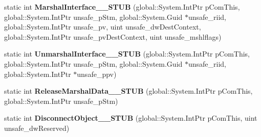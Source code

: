 \begin{DoxyCompactItemize}
\item 
\mbox{\label{struct_system_1_1_runtime_1_1_interop_services_1_1_i_marshal_____system___runtime___windows_runtime_____impl_1_1_vtbl_a8ca757bdde9525e1da4e2ba60a35ffd6}} 
static int {\bfseries Marshal\+Interface\+\_\+\+\_\+\+S\+T\+UB} (global\+::\+System.\+Int\+Ptr p\+Com\+This, global\+::\+System.\+Int\+Ptr unsafe\+\_\+p\+Stm, global\+::\+System.\+Guid $\ast$unsafe\+\_\+riid, global\+::\+System.\+Int\+Ptr unsafe\+\_\+pv, uint unsafe\+\_\+dw\+Dest\+Context, global\+::\+System.\+Int\+Ptr unsafe\+\_\+pv\+Dest\+Context, uint unsafe\+\_\+mshlflags)
\item 
\mbox{\label{struct_system_1_1_runtime_1_1_interop_services_1_1_i_marshal_____system___runtime___windows_runtime_____impl_1_1_vtbl_a6325016e621765b68878de65e7fe333e}} 
static int {\bfseries Unmarshal\+Interface\+\_\+\+\_\+\+S\+T\+UB} (global\+::\+System.\+Int\+Ptr p\+Com\+This, global\+::\+System.\+Int\+Ptr unsafe\+\_\+p\+Stm, global\+::\+System.\+Guid $\ast$unsafe\+\_\+riid, global\+::\+System.\+Int\+Ptr $\ast$unsafe\+\_\+ppv)
\item 
\mbox{\label{struct_system_1_1_runtime_1_1_interop_services_1_1_i_marshal_____system___runtime___windows_runtime_____impl_1_1_vtbl_acb4ef2d5853f6ed1823d32c7939a9c80}} 
static int {\bfseries Release\+Marshal\+Data\+\_\+\+\_\+\+S\+T\+UB} (global\+::\+System.\+Int\+Ptr p\+Com\+This, global\+::\+System.\+Int\+Ptr unsafe\+\_\+p\+Stm)
\item 
\mbox{\label{struct_system_1_1_runtime_1_1_interop_services_1_1_i_marshal_____system___runtime___windows_runtime_____impl_1_1_vtbl_a190a87511db9790b75721ec9fbbf6db5}} 
static int {\bfseries Disconnect\+Object\+\_\+\+\_\+\+S\+T\+UB} (global\+::\+System.\+Int\+Ptr p\+Com\+This, uint unsafe\+\_\+dw\+Reserved)
\item 
\mbox{\label{struct_system_1_1_runtime_1_1_interop_services_1_1_i_marshal_____system___runtime___windows_runtime_____impl_1_1_vtbl_a952344c0b9708ed27abae95ba1e22bc8}} 

\end{DoxyCompactItemize}
